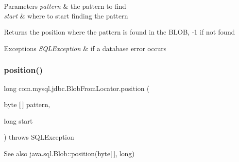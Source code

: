 \begin{DoxyParams}{Parameters}
{\em pattern} & the pattern to find \\
\hline
{\em start} & where to start finding the pattern\\
\hline
\end{DoxyParams}
\begin{DoxyReturn}{Returns}
the position where the pattern is found in the B\+L\+OB, -\/1 if not found
\end{DoxyReturn}

\begin{DoxyExceptions}{Exceptions}
{\em S\+Q\+L\+Exception} & if a database error occurs \\
\hline
\end{DoxyExceptions}
\mbox{\label{classcom_1_1mysql_1_1jdbc_1_1_blob_from_locator_a7182686d365a7bbf4ced728928ccf3b2}} 
\subsubsection{\texorpdfstring{position()}{position()}\hspace{0.1cm}{\footnotesize\ttfamily [2/2]}}
{\footnotesize\ttfamily long com.\+mysql.\+jdbc.\+Blob\+From\+Locator.\+position (\begin{DoxyParamCaption}\item[{byte \mbox{[}$\,$\mbox{]}}]{pattern,  }\item[{long}]{start }\end{DoxyParamCaption}) throws S\+Q\+L\+Exception}

\begin{DoxySeeAlso}{See also}
java.\+sql.\+Blob\+::position(byte\mbox{[}$\,$\mbox{]}, long) 
\end{DoxySeeAlso}
\mbox{\label{classcom_1_1mysql_1_1jdbc_1_1_blob_from_locator_abf802cf4f616472a72e73540b2a06265}} 
